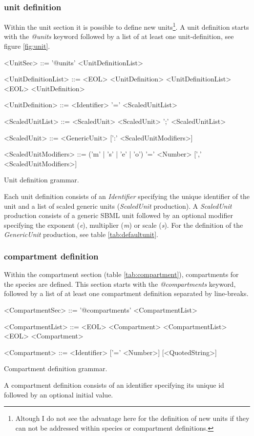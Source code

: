 \documentclass[a4paper]{article}
\begin{document}
\subsubsection*{unit definition}
Within the unit section it is possible to define new units\footnote{Altough I do not see the advantage here for the definition of new units if they can not be addressed within species or compartment definitions.}. A unit definition starts with the \emph{@units} keyword followed by a list of at least one unit-definition, see figure \ref{fig:unit}. 

\begin{table}[h!]
\begin{grammar}
<UnitSec> ::= '@units' <UnitDefinitionList>

<UnitDefinitionList> ::= <EOL> <UnitDefinition> <UnitDefinitionList>
  \alt <EOL> <UnitDefinition>
  
<UnitDefinition> ::= <Identifier> '=' <ScaledUnitList> 

<ScaledUnitList> ::= <ScaledUnit>
  \alt <ScaledUnit> ';' <ScaledUnitList>

<ScaledUnit> ::= <GenericUnit> [':' <ScaledUnitModifiers>]

<ScaledUnitModifiers> ::= ('m' | 's' | 'e' | 'o') '=' <Number> [',' <ScaledUnitModifiers>]
\end{grammar}
\caption{Unit definition grammar.} \label{fig:unit}
\end{table}
Each unit definition consists of an \emph{Identifier} specifying the unique identifier of the unit and a list of scaled generic units (\emph{ScaledUnit} production). A \emph{ScaledUnit} production consists of a generic SBML unit followed by an optional modifier specifying the exponent (\emph{e}), multiplier (\emph{m}) or scale (\emph{s}). For the definition of the \emph{GenericUnit} production, see table \ref{tab:defaultunit}.


\subsubsection*{compartment definition}
Within the compartment section (table \ref{tab:compartment}), compartments for the species are defined. This section starts with the \emph{@compartments} keyword, followed by a list of at least one compartment definition separated by line-breaks.

\begin{table}[h!]
\begin{grammar}
<CompartmentSec> ::= '@compartments' <CompartmentList>

<CompartmentList> ::= <EOL> <Compartment> <CompartmentList>
  \alt <EOL> <Compartment> 
  
<Compartment> ::= <Identifier> ['=' <Number>] [<QuotedString>]
\end{grammar}
\caption{Compartment definition grammar.} \label{tab:compartment}
\end{table}
A compartment definition consists of an identifier specifying its unique id followed by an optional initial value.
\end{document}
